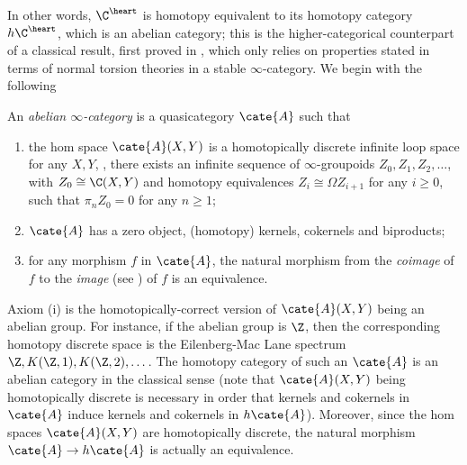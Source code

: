 In other words, $\C^\heart$ is homotopy equivalent to its homotopy category $h\C^\heart$, which is an abelian category; this is the higher-categorical counterpart of a classical result, first proved in \cite[Thm. \textbf{1.3.6}]{BBDPervers}, 
which 
only relies on properties stated in terms of normal torsion theories in a stable $\infty$-category. 
We begin with the following
\begin{definition}\label{df:abelinfty}
An \emph{abelian $\infty$-category} is a quasicategory $\cate{A}$ such that
\begin{enumerate}[label=$\roman*$)]
\item the hom space $\cate{A}(X,Y)$ is a homotopically discrete infinite loop space for any $X, Y$, \ie, there exists an infinite sequence of $\infty$-groupoids $Z_0, Z_1,Z_2,\dots$, with $Z_0\cong \C(X,Y)$ and homotopy equivalences $Z_i\cong \Omega Z_{i+1}$ for any $i\geq 0$, such that $\pi_n Z_0=0$ for any $n\geq 1$;
\item $\cate{A}$ has a zero object, (homotopy) kernels, cokernels and biproducts;
\item for any morphism $f$ in $\cate{A}$, the natural morphism from the \emph{coimage} of $f$ to the \emph{image} (see \adef{}) of $f$ is an equivalence.
\end{enumerate}
\end{definition}
\begin{remark}
Axiom (i) is the homotopically-correct version of $\cate{A}(X,Y)$ being an abelian group. For instance, if the abelian group is $\Z $, then the corresponding homotopy discrete space is the Eilenberg-Mac Lane spectrum $\Z ,K(\Z ,1), K(\Z ,2),\dots$. The homotopy category of such an $\cate{A}$ is an abelian category in the classical sense (note that $\cate{A}(X,Y)$ being homotopically discrete is necessary in order that kernels and cokernels in $\cate{A}$ induce kernels and cokernels in $h\cate{A}$). Moreover, since the hom spaces $\cate{A}(X,Y)$ are homotopically discrete, the natural morphism $\cate{A}\to h\cate{A}$ is actually an equivalence.
\end{remark}

